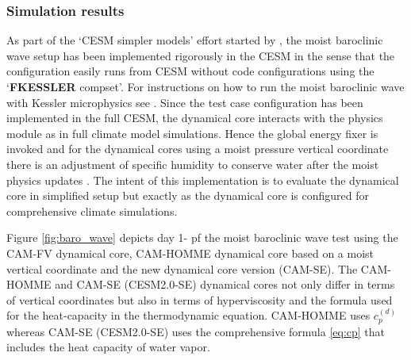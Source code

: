 \documentclass{agujournal}
\begin{document}
{%

\subsubsection{Simulation results}
As part of the `CESM simpler models' effort started by \citet{CESM_SIMPLER_MODELS}, the moist baroclinic wave setup has been implemented rigorously in the CESM in the sense that the configuration easily runs from CESM without code configurations using the `{\bf{FKESSLER}} compset'. For instructions on how to run the moist baroclinic wave with Kessler microphysics see \citet{FKESSLER}. Since the test case configuration has been implemented in the full CESM, the dynamical core interacts with the physics module as in full climate model simulations. Hence the global energy fixer is invoked \citep{WOHTTV2015JAMES} and for the dynamical cores using a moist pressure vertical coordinate there is an adjustment of specific humidity to conserve water after the moist physics updates \citep[see Section 3.1.6 in ][]{CAM5}. The intent of this implementation is to evaluate the dynamical core in simplified setup but exactly as the dynamical core is configured for comprehensive climate simulations.

Figure \ref{fig:baro_wave} depicts day 1- pf the moist baroclinic wave test using the CAM-FV \citep[Finite-Volume; ][]{L2004MWR} dynamical core, CAM-HOMME dynamical core based on a moist vertical coordinate and the new dynamical core version (CAM-SE). The CAM-HOMME and CAM-SE (CESM2.0-SE) dynamical cores not only differ in terms of vertical coordinates but also in terms of hyperviscosity and the formula used for the heat-capacity in the thermodynamic equation. CAM-HOMME uses $c_p^{(d)}$ whereas CAM-SE (CESM2.0-SE) uses the comprehensive formula \eqref{eq:cp} that includes the heat capacity of water vapor.

}
\end{document}
